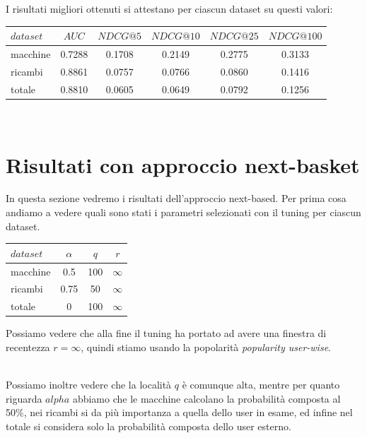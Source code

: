 I risultati migliori ottenuti si attestano per ciascun dataset su questi valori:\\

\begin{tabular}{|l|ccccc|}
    \toprule
    $dataset$  & $AUC$ & $NDCG@5$ & $NDCG@10$  & $NDCG@25$ & $NDCG@100$  \\
    \midrule
    macchine & 0.7288 & 0.1708 & 0.2149 & 0.2775 & 0.3133 \\
    ricambi & 0.8861  & 0.0757 & 0.0766 & 0.0860 & 0.1416 \\
    totale  & 0.8810  & 0.0605 & 0.0649 & 0.0792 & 0.1256 \\
\bottomrule
\end{tabular}\\

\section{Risultati con approccio next-basket}
In questa sezione vedremo i risultati dell'approccio next-based. Per prima cosa andiamo a vedere quali sono stati i parametri selezionati con il tuning per ciascun dataset.\\

\begin{minipage}[H]{0.45\textwidth}
    \begin{tabular}{|l|ccc|}
        \toprule
        $dataset$ &    $\alpha$ &  $q$ & $r$ \\
        \midrule
        macchine & 0.5 & 100 & $\infty$ \\
        ricambi  &	0.75 & 50 & $\infty$ \\
        totale  & 0 & 100 & $\infty$ \\
    \bottomrule
    \end{tabular}
\end{minipage}
\begin{minipage}[H]{0.55\textwidth}
    Possiamo vedere che alla fine il tuning ha portato ad avere una finestra di recentezza  $r = \infty$, quindi stiamo usando la popolarità \textit{popularity user-wise}. 
\end{minipage}\\

Possiamo inoltre vedere che la località $q$ è comunque alta, mentre per quanto riguarda $alpha$ abbiamo che le macchine calcolano la probabilità composta al 50\%, nei ricambi si da più importanza a quella dello user in esame, ed infine nel totale si considera solo la probabilità composta dello user esterno.

